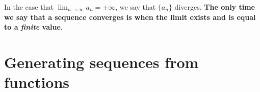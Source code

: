 \documentclass{ximera}
\begin{document}
%
%    
%

\begin{warning}
  In the case that $\lim_{n \to \infty} a_n = \pm\infty$, we say that
  $\{a_n\}$ diverges.  \textbf{The only time we say that a sequence converges
    is when the limit exists and is equal to a \textit{finite} value}.
\end{warning}


\section{Generating sequences from functions}
\end{document}
